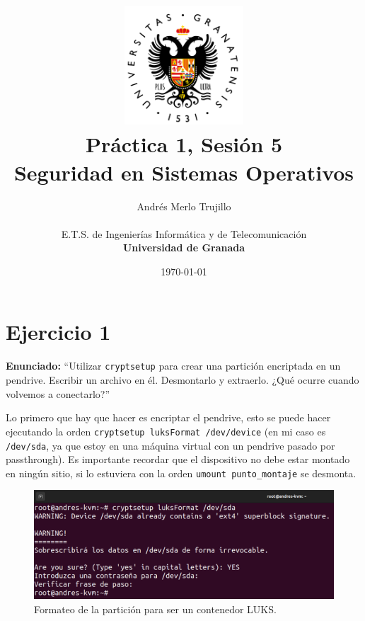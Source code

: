 \documentclass{article}
\title{
\includegraphics[width=1.75in]{imagenes/UGR-Logo.png} \\
\vspace*{1in}
\textbf{Práctica 1, Sesión 5} \\
Seguridad en Sistemas Operativos \\
\vspace*{0.5in}}
\author{Andrés Merlo Trujillo \\
\vspace*{0.5in} \\
E.T.S. de Ingenierías Informática y de Telecomunicación \\
\textbf{Universidad de Granada}} \date{\today}
\begin{document}
\begin{titlingpage}
    \maketitle
\end{titlingpage}

\tableofcontents

\newpage

\pagestyle{fancy}

\section{Ejercicio 1}

\textbf{Enunciado: }``Utilizar \texttt{cryptsetup} para crear una partición encriptada en un pendrive. Escribir un archivo en él. Desmontarlo y extraerlo. ¿Qué ocurre cuando volvemos a conectarlo?''

\bigskip

Lo primero que hay que hacer es encriptar el pendrive, esto se puede hacer ejecutando la orden \verb|cryptsetup luksFormat /dev/device| (en mi caso es \verb|/dev/sda|, ya que estoy en una máquina virtual con un pendrive pasado por passthrough). Es importante recordar que el dispositivo no debe estar montado en ningún sitio, si lo estuviera con la orden \verb|umount punto_montaje| se desmonta.

\begin{figure}[H]
    \includegraphics[width=\textwidth]{imagenes/Captura desde 2022-10-30 10-51-54.png}
    \caption{Formateo de la partición para ser un contenedor LUKS.}
\end{figure}
\end{document}
